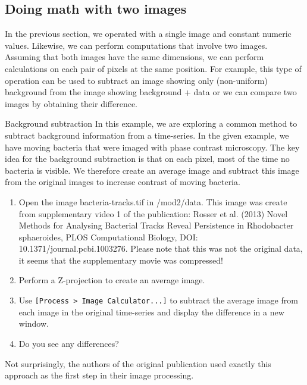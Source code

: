 \subsection{Doing math with two images}
In the previous section, we operated with a single image and constant numeric values. Likewise, we can perform computations that involve two images. Assuming that both images have the same dimensions, we can perform calculations on each pair of pixels at the same position. For example, this type of operation can be used to subtract an image showing only (non-uniform) background from the image showing background + data or we can compare two images by obtaining their difference.

\begin{taskbox}{Background subtraction}
In this example, we are exploring a common method to subtract background information from a time-series. In the given example, we have moving bacteria that were imaged with phase contrast microscopy. The key idea for the background subtraction is that on each pixel, most of the time no bacteria is visible. We therefore create an average image and subtract this image from the original images to increase contrast of moving bacteria.

\begin{enumerate}
	\item Open the image bacteria-tracks.tif in /mod2/data. This image was create from supplementary video 1 of the publication: Rosser et al. (2013) Novel Methods for Analysing Bacterial Tracks Reveal Persistence in Rhodobacter sphaeroides, PLOS Computational Biology, DOI: 10.1371/journal.pcbi.1003276. Please note that this was not the original data, it seems that the supplementary movie was compressed!
	\item Perform a Z-projection to create an average image.
	\item Use \texttt{[Process > Image Calculator...]} to subtract the average image from each image in the original time-series and display the difference in a new window.
	\item Do you see any differences?
\end{enumerate}

Not surprisingly, the authors of the original publication used exactly this approach as the first step in their image processing.

\end{taskbox}

